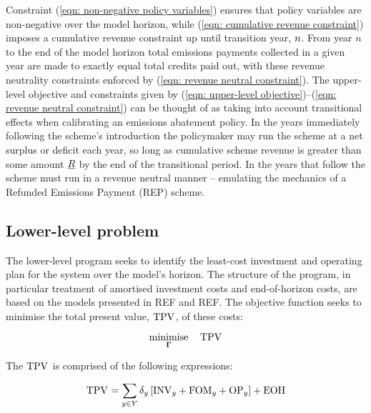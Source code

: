 \documentclass{article}
\DeclareMathOperator*{\minimise}{minimise}
\begin{document}
Constraint (\ref{eqn: non-negative policy variables}) ensures that policy variables are non-negative over the model horizon, while (\ref{eqn: cumulative revenue constraint}) imposes a cumulative revenue constraint up until transition year, $n$. From year $n$ to the end of the model horizon total emissions payments collected in a given year are made to exactly equal total credits paid out, with these revenue neutrality constraints enforced by (\ref{eqn: revenue neutral constraint}). The upper-level objective and constraints given by (\ref{eqn: upper-level objective})--(\ref{eqn: revenue neutral constraint}) can be thought of as taking into account transitional effects when calibrating an emissions abatement policy. In the years immediately following the scheme's introduction the policymaker may run the scheme at a net surplus or deficit each year, so long as cumulative scheme revenue is greater than some amount $\underline{R}$ by the end of the transitional period. In the years that follow the scheme must run in a revenue neutral manner -- emulating the mechanics of a Refunded Emissions Payment (REP) scheme.

\subsection{Lower-level problem}
The lower-level program seeks to identify the least-cost investment and operating plan for the system over the model's horizon. The structure of the program, in particular treatment of amortised investment costs and end-of-horizon costs, are based on the models presented in REF and REF. The objective function seeks to minimise the total present value, $\mathrm{TPV}_{}$, of these costs:

\begin{equation}
	\minimise\limits_{\bm{\Gamma}} \quad \cTotalPresentValue
\end{equation}

The $\mathrm{TPV}_{}$ is comprised of the following expressions:

\begin{align}
\begin{split}
\cTotalPresentValue & = \sum\limits_{\iYear \in \sYears} \cDiscountRate \left[\cInvestmentCost + \cFixedOperationsMaintenanceCost + \cOperatingCost[\iYear] \right] 
+ \cEndOfHorizonCost \\
\end{split}
\label{eqn: total present value expression}
\end{align}
\end{document}
